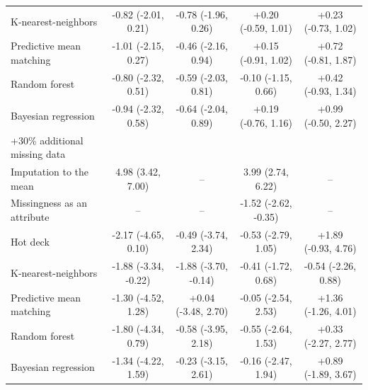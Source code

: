 \documentclass{article}
\begin{document}
\begin{table}
\begin{tabular}{lcccc}
K-nearest-neighbors & -0.82 (-2.01, 0.21) & -0.78 (-1.96, 0.26) & +0.20 (-0.59, 1.01) & +0.23 (-0.73, 1.02) \\ 
Predictive mean matching & -1.01 (-2.15, 0.27) & -0.46 (-2.16, 0.94) & +0.15 (-0.91, 1.02) & +0.72 (-0.81, 1.87) \\ 
Random forest & -0.80 (-2.32, 0.51) & -0.59 (-2.03, 0.81) & -0.10 (-1.15, 0.66) & +0.42 (-0.93, 1.34) \\ 
Bayesian regression & -0.94 (-2.32, 0.58) & -0.64 (-2.04, 0.89) & +0.19 (-0.76, 1.16) & +0.99 (-0.50, 2.27) \\ 
\midrule
\multicolumn{1}{l}{+30\% additional missing data} \\ 
\midrule
Imputation to the mean & 4.98 (3.42, 7.00) & -- & 3.99 (2.74, 6.22) & -- \\ 
Missingness as an attribute & -- & -- & -1.52 (-2.62, -0.35) & -- \\ 
Hot deck & -2.17 (-4.65, 0.10) & -0.49 (-3.74, 2.34) & -0.53 (-2.79, 1.05) & +1.89 (-0.93, 4.76) \\ 
K-nearest-neighbors & -1.88 (-3.34, -0.22) & -1.88 (-3.70, -0.14) & -0.41 (-1.72, 0.68) & -0.54 (-2.26, 0.88) \\ 
Predictive mean matching & -1.30 (-4.52, 1.28) & +0.04 (-3.48, 2.70) & -0.05 (-2.54, 2.53) & +1.36 (-1.26, 4.01) \\ 
Random forest & -1.80 (-4.34, 0.79) & -0.58 (-3.95, 2.18) & -0.55 (-2.64, 1.53) & +0.33 (-2.27, 2.77) \\ 
Bayesian regression & -1.34 (-4.22, 1.59) & -0.23 (-3.15, 2.61) & -0.16 (-2.47, 1.94) & +0.89 (-1.89, 3.67) \\ 
\bottomrule
\end{tabular} 
 \end{table}

\clearpage
\end{document}
